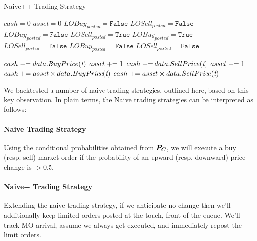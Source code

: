 \begin{algorithm}
\caption{Naive++ Trading Strategy}
\begin{algorithmic}[1]
\State $cash = 0$
\State $asset = 0$
\State $LOBuy_{posted} = \texttt{False}$
\State $LOSell_{posted} = \texttt{False}$
		\State $LOBuy_{posted} = \texttt{False}$
		\State $LOSell_{posted} = \texttt{True}$
		\State $LOBuy_{posted} = \texttt{True}$
		\State $LOSell_{posted} = \texttt{False}$
		\State $LOBuy_{posted} = \texttt{False}$
		\State $LOSell_{posted} = \texttt{False}$
	\EndIf

			\State $cash \mathrel{-}= data.BuyPrice(\textit{t})$	
			\State $asset \mathrel{+}= 1$
			\State $cash \mathrel{+}= data.SellPrice(\textit{t})$
			\State $asset \mathrel{-}= 1$
		\EndIf
	\EndFor
\EndFor
{} 
\State $cash \mathrel{+}= asset \times data.BuyPrice(\textit{t})$
\State $cash \mathrel{+}= asset \times data.SellPrice(\textit{t})$	
\EndIf
\end{algorithmic}
\end{algorithm}

We backtested a number of naive trading strategies, outlined here, based on this key observation. In plain terms, the Naive trading strategies can be interpreted as follows:

\paragraph{Naive Trading Strategy}  Using the conditional probabilities obtained from $\boldsymbol{P_C}$, we will execute a buy (resp. sell) market order if the probability of an upward (resp. downward) price change is $> 0.5$.

\paragraph{Naive+ Trading Strategy} Extending the naive trading strategy, if we anticipate no change then we'll additionally keep limited orders posted at the touch, front of the queue. We'll track MO arrival, assume we always get executed, and immediately repost the limit orders.

